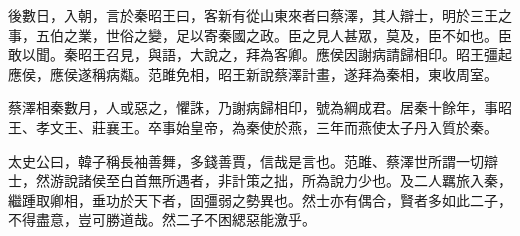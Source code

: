 後數日，入朝，言於秦昭王曰，客新有從山東來者曰蔡澤，其人辯士，明於三王之事，五伯之業，世俗之變，足以寄秦國之政。臣之見人甚眾，莫及，臣不如也。臣敢以聞。秦昭王召見，與語，大說之，拜為客卿。應侯因謝病請歸相印。昭王彊起應侯，應侯遂稱病甐。范雎免相，昭王新說蔡澤計畫，遂拜為秦相，東收周室。

蔡澤相秦數月，人或惡之，懼誅，乃謝病歸相印，號為綱成君。居秦十餘年，事昭王、孝文王、莊襄王。卒事始皇帝，為秦使於燕，三年而燕使太子丹入質於秦。

太史公曰，韓子稱長袖善舞，多錢善賈，信哉是言也。范雎、蔡澤世所謂一切辯士，然游說諸侯至白首無所遇者，非計策之拙，所為說力少也。及二人羈旅入秦，繼踵取卿相，垂功於天下者，固彊弱之勢異也。然士亦有偶合，賢者多如此二子，不得盡意，豈可勝道哉。然二子不困緦惡能激乎。
